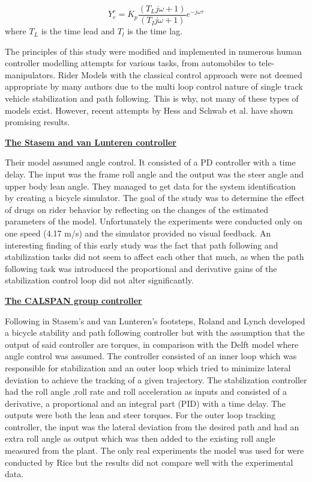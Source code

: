\begin{equation}
    Y_{e}^{c}=K_{p} \frac{\left(T_{L} j \omega+1\right)}{\left(T_{I} j \omega+1\right)} e^{-j \omega \tau}
    \label{eq:equation4}
\end{equation}
where \ensuremath{T_L} is the time lead and \ensuremath{T_l} is the time lag.

\par
 The principles of this study were modified and implemented in numerous human controller modelling attempts for various tasks, from automobiles to tele-manipulators. Rider Models with the classical control approach were not deemed appropriate by many authors due to the multi loop control nature of single track vehicle stabilization and path following. This is why, not many of these types of models exist. However, recent attempts  by Hess\cite{hess2012modeling} and Schwab et al.\cite{schwab2013} have shown promising results.

\underline{\textbf{The Stasem and van Lunteren controller\cite{van1970influence}}}
\newline

Their model assumed angle control. It consisted of a PD controller with a time delay. The input was the frame roll angle and the output was the steer angle and upper body lean angle. They managed to get data for the system identification by creating a bicycle simulator. The goal of the study was to determine the effect of drugs on rider behavior by reflecting on the changes of the estimated parameters of the model. Unfortunately the experiments were conducted only on one speed (4.17 m/s) and the simulator provided no visual feedback. An interesting finding of this early study was the fact that path following and stabilization tasks did not seem to affect each other that much, as when the path following task was introduced  the proportional and derivative gains of the stabilization control loop did not alter significantly.

\bigbreak

\underline{\textbf{The CALSPAN group controller\cite{roland1971digital,roland1972bicycle,roland1973computer}}}
\newline

Following in Stasem’s and van Lunteren’s footsteps, Roland and Lynch developed a bicycle stability and path following controller but with the assumption that the output of said controller are torques, in comparison with the Delft model where angle control was assumed. The controller consisted of an inner loop which was responsible for stabilization and an outer loop which tried to minimize lateral deviation to achieve the tracking of a given trajectory.  The stabilization controller had the roll angle ,roll rate and roll acceleration as inputs  and consisted of a derivative, a proportional and an integral part (PID) with a time delay. The outputs were both the lean and steer torques. For the outer loop tracking controller, the input was the lateral deviation from the desired path and had an extra roll angle as output which was then added to the existing roll angle measured from the plant.  The only real experiments the model was used for were conducted by Rice\cite{rice1978rider} but the results did not compare well with the experimental data.

